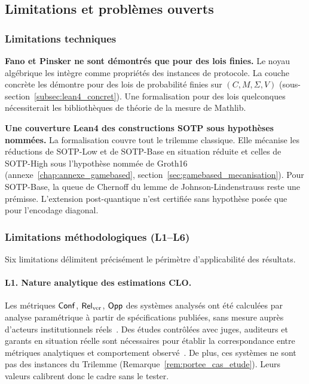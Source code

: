 \subsection{Limitations et probl\`emes ouverts}
\label{subsec:limitations_problemes_ouverts}
\begin{sloppypar}

\subsubsection{Limitations techniques}
\label{subsubsec:limitations_techniques}

\textbf{Fano et Pinsker ne sont d\'emontr\'es que pour des lois finies.}
Le noyau alg\'ebrique les int\`egre comme propri\'et\'es des instances de
protocole. La couche concr\`ete les d\'emontre pour des lois de probabilit\'e finies
sur $(C, M, \Sigma, V)$ (sous-section~\ref{subsec:lean4_concret}). Une formalisation
pour des lois quelconques n\'ecessiterait les biblioth\`eques de th\'eorie de la
mesure de Mathlib.

\textbf{Une couverture Lean4 des constructions SOTP sous hypoth\`eses nomm\'ees.}
La formalisation couvre tout le trilemme classique. Elle m\'ecanise les r\'eductions de SOTP-Low
et de SOTP-Base en situation r\'eduite et celles de SOTP-High sous l'hypoth\`ese nomm\'ee de
Groth16 (annexe~\ref{chap:annexe_gamebased}, section~\ref{sec:gamebased_mecanisation}). Pour
SOTP-Base, la queue de Chernoff du lemme de Johnson-Lindenstrauss reste une pr\'emisse.
L'extension post-quantique n'est certifi\'ee sans hypoth\`ese pos\'ee que pour l'encodage
diagonal.

\subsubsection{Limitations m\'ethodologiques (L1--L6)}
\label{subsubsec:limitations_methodologiques}

Six limitations d\'elimitent pr\'ecis\'ement le p\'erim\`etre
d'applicabilit\'e des r\'esultats.

\paragraph{L1. Nature analytique des estimations CLO.}
Les m\'etriques $\mathsf{Conf}$, $\mathsf{Rel}_{\mathrm{ver}}$, $\mathsf{Opp}$ des syst\`emes
analys\'es ont \'et\'e calcul\'ees par analyse param\'etrique \`a partir
de sp\'ecifications publi\'ees, sans mesure aupr\`es d'acteurs
institutionnels r\'eels~\cite{MINKA2026CLO}. Des \'etudes contr\^ol\'ees
avec juges, auditeurs et garants en situation r\'eelle sont n\'ecessaires
pour \'etablir la correspondance entre m\'etriques analytiques et
comportement observ\'e~\cite{Casey11,Goodman15,Campbell1976,Saltelli2008}. De
plus, ces syst\`emes ne sont pas des instances du Trilemme
(Remarque~\ref{rem:portee_cas_etude}). Leurs valeurs calibrent donc le cadre sans le
tester.


\end{sloppypar}
